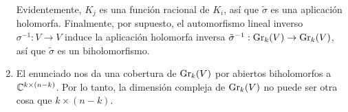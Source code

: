 \begin{solution}
\begin{enumerate}[label=\alph*)]
    Evidentemente, $K_j$ es una función racional de $K_i$, así que $\tilde \sigma$ es una aplicación holomorfa. Finalmente, por supuesto, el automorfismo lineal inverso $\sigma^{-1} : V \to V$ induce la aplicación holomorfa inversa $\tilde \sigma^{-1} : \operatorname{Gr}_k(V) \to \operatorname{Gr}_k(V)$, así que $\tilde \sigma$ es un biholomorfismo.
    
    \item El enunciado nos da una cobertura de $\operatorname{Gr}_k(V)$ por abiertos biholomorfos a $\mathbb C^{k \times (n-k)}$. Por lo tanto, la dimensión compleja de $\operatorname{Gr}_k(V)$ no puede ser otra cosa que $k \times (n-k)$.
\end{enumerate}
\end{solution}
